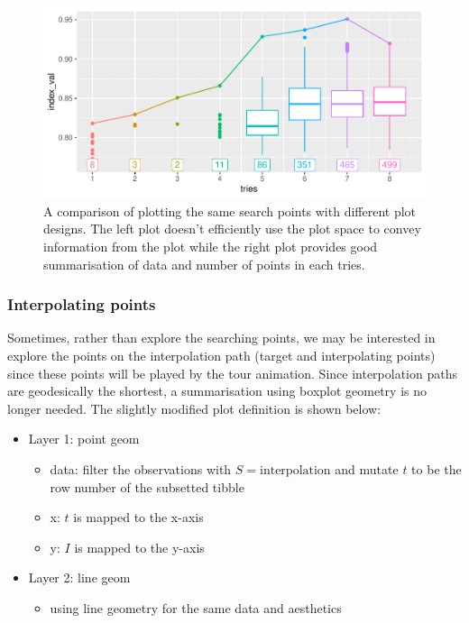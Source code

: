 \documentclass[12pt]{article}
\providecommand{\tightlist}{%
  \setlength{\itemsep}{0pt}\setlength{\parskip}{0pt}}
\begin{document}
\begin{figure}
\centering
\includegraphics{paper_files/figure-latex/points-tries-1.pdf}
\caption{\label{points}A comparison of plotting the same search points
with different plot designs. The left plot doesn't efficiently use the
plot space to convey information from the plot while the right plot
provides good summarisation of data and number of points in each tries.}
\end{figure}

\hypertarget{interpolating-points}{%
\subsubsection{Interpolating points}\label{interpolating-points}}

Sometimes, rather than explore the searching points, we may be
interested in explore the points on the interpolation path (target and
interpolating points) since these points will be played by the tour
animation. Since interpolation paths are geodesically the shortest, a
summarisation using boxplot geometry is no longer needed. The slightly
modified plot definition is shown below:

\begin{itemize}
\tightlist
\item
  Layer 1: point geom

  \begin{itemize}
  \tightlist
  \item
    data: filter the observations with \(S = \text{interpolation}\) and
    mutate \(t\) to be the row number of the subsetted tibble
  \item
    x: \(t\) is mapped to the x-axis
  \item
    y: \(I\) is mapped to the y-axis
  \end{itemize}
\item
  Layer 2: line geom

  \begin{itemize}
  \tightlist
  \item
    using line geometry for the same data and aesthetics
  \end{itemize}
\end{itemize}
\end{document}
